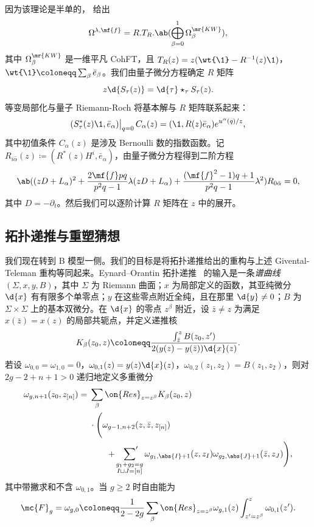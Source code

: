 因为该理论是半单的， 给出
\[ \Omega^{\lambda,\mf{f}} = R.T_R.\ab(\bigoplus_{\beta=0}^1 \Omega^{\mr{KW}}_{\beta}), \]
其中 \(\Omega^{\mr{KW}}_{\beta}\) 是一维平凡 CohFT，且 \(T_R(z) = z(\wt{\1}-R^{-1}(z)\1)\)，\(\wt{\1} \coloneqq \sum_{\beta}\bar{e}_{\beta}\)。我们由量子微分方程确定 \(R\) 矩阵
\[ z \d{S_{\tau}(z)} = \d{\tau} \star_{\tau} S_{\tau}(z). \]
等变局部化与量子 Riemann-Roch 将基本解与 \(R\) 矩阵联系起来：
\[ (S^*_{\tau}(z)\1, \bar{e}_{\alpha})\big|_{q=0}\, C_{\alpha}(z) = (\1, R(z)\bar{e}_{\alpha})e^{u^{\alpha}(q)/z}, \]
其中初值条件 \(C_{\alpha}(z)\) 是涉及 Bernoulli 数的指数函数。记 \(R_{i\bar{\alpha}}(z) \coloneqq (R^*(z)H^i, \bar{e}_{\alpha})\)，由量子微分方程得到二阶方程
\[ \ab( (zD+L_{\alpha})^2 + \frac{2\mf{f}pq}{p^2q-1}\lambda(zD+L_{\alpha}) + \frac{(\mf{f}^2-1)q+1}{p^2q-1}\lambda^2 )R_{0\bar{\alpha}} = 0, \]
其中 \(D = -\partial_t\)。然后我们可以逐阶计算 \(R\) 矩阵在 \(z\) 中的展开。

\subsection{拓扑递推与重塑猜想}%
\label{sub:Topological recursion and the remodeling conjecture}

我们现在转到 B 模型一侧。我们的目标是将拓扑递推给出的重构与上述 Givental-Teleman 重构等同起来。Eynard--Orantin 拓扑递推~\cite{EO2007} 的输入是一条\textit{谱曲线} \((\Sigma,x,y,B)\)，其中 \(\Sigma\) 为 Riemann 曲面；\(x\) 为局部定义的函数，其亚纯微分 \(\d{x}\) 有有限多个单零点；\(y\) 在这些零点附近全纯，且在那里 \(\d{y} \neq 0\)；\(B\) 为 \(\Sigma \times \Sigma\) 上的基本双微分。在 \(\d{x}\) 的零点 \(z^{\beta}\) 附近，设 \(\bar{z} \neq z\) 为满足 \(x(\bar{z}) = x(z)\) 的局部共轭点，并定义递推核
\[ K_{\beta}(z_0,z) \coloneqq \frac{\int_{\bar{z}}^z B(z_0,z')}{2(y(z)-y(\bar{z}))\d{x}(z)}. \]
若设 \(\omega_{0,0} = \omega_{1,0} = 0\)，\(\omega_{0,1}(z) = y(z)\d{x}(z)\)，\(\omega_{0,2}(z_1,z_2) = B(z_1,z_2)\)，则对 \(2g-2+n+1 > 0\) 递归地定义多重微分
\begin{align*}
    \omega_{g,n+1}(z_0,z_{[n]}) ={}& \sum_{\beta}\on{Res}_{z = z^{\beta}} K_{\beta}(z_0,z) \\
    &\cdot \Bigg( \omega_{g-1,n+2}(z,\bar{z},z_{[n]}) \\
    &\qquad + \sideset{}{'}\sum_{\substack{g_1+g_2 = g \\ I \sqcup J = [n]}}\omega_{g_1,\abs{I}+1}(z,z_I)\omega_{g_2,\abs{J}+1}(\bar{z},z_J)\Bigg),
\end{align*}
其中带撇求和不含 \(\omega_{0,1}\)。当 \(g \geq 2\) 时自由能为
\[ \mc{F}_g = \omega_{g,0} \coloneqq \frac{1}{2-2g}\sum_{\beta}\on{Res}_{z=z^{\beta}}\omega_{g,1}(z)\int_{z'=z^{\beta}}^z \omega_{0,1}(z'). \]

